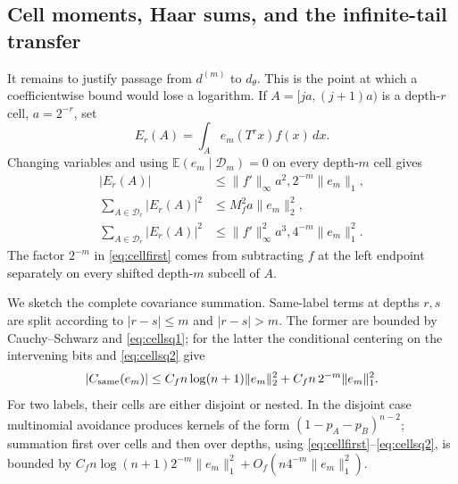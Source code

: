 \documentclass[11pt]{article}
\numberwithin{equation}{section}
\theoremstyle{definition}\newtheorem{definition}[theorem]{Definition}
\theoremstyle{remark}\newtheorem{remark}[theorem]{Remark}
\newcommand{\E}{\mathbb E}\newcommand{\Pp}{\mathbb P}
\newcommand{\1}{\mathbf 1}\newcommand{\cD}{\mathcal D}
\begin{document}
\subsection{Cell moments, Haar sums, and the infinite-tail transfer}
It remains to justify passage from $d^{(m)}$ to $d_\theta$.  This is the
point at which a coefficientwise bound would lose a logarithm.  If
$A=[ja,(j+1)a)$ is a depth-$r$ cell, $a=2^{-r}$, set
\begin{equation}E_r(A)=\int_A e_m(T^rx)f(x)\,dx.           \label{eq:Er}
\end{equation}
Changing variables and using
$\E(e_m\mid\mathcal D_m)=0$ on every depth-$m$ cell gives
\begin{align}
 |E_r(A)|&\le \|f'\|_\infty a^2,2^{-m}\|e_m\|_1,
                                                               \label{eq:cellfirst}\\
 \sum_{A\in\mathcal D_r}|E_r(A)|^2
 &\le M_f^2a\|e_m\|_2^2,                                   \label{eq:cellsq1}\\
 \sum_{A\in\mathcal D_r}|E_r(A)|^2
 &\le \|f'\|_\infty^2a^3,4^{-m}\|e_m\|_1^2.              \label{eq:cellsq2}
\end{align}
The factor $2^{-m}$ in \eqref{eq:cellfirst} comes from subtracting $f$ at
the left endpoint separately on every shifted depth-$m$ subcell of $A$.

We sketch the complete covariance summation.  Same-label terms at depths
$r,s$ are split according to $|r-s|\le m$ and $|r-s|>m$.  The former are
bounded by Cauchy--Schwarz and \eqref{eq:cellsq1}; for the latter the
conditional centering on the intervening bits and \eqref{eq:cellsq2} give
\begin{equation}
 |C_{\rm same}(e_m)|\le
 C_f n\log(n+1)\|e_m\|_2^2+C_fn\,2^{-m}\|e_m\|_1^2.       \label{eq:samecov}
\end{equation}
For two labels, their cells are either disjoint or nested.  In the disjoint
case multinomial avoidance produces kernels of the form
$(1-p_A-p_B)^{n-2}$; summation first over cells and then over depths, using
\eqref{eq:cellfirst}--\eqref{eq:cellsq2}, is bounded by
$C_fn\log(n+1)2^{-m}\|e_m\|_1^2+O_f(n4^{-m}\|e_m\|_1^2)$.
\end{document}
